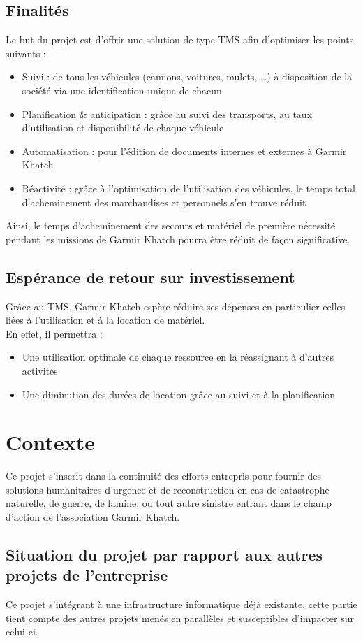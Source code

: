 \subsection{Finalités}
Le but du projet est d'offrir une solution de type TMS afin d'optimiser les points suivants :
\begin{itemize}
\item Suivi : de tous les véhicules (camions, voitures, mulets, …) à disposition de la société via une identification unique de chacun
\item Planification \& anticipation : grâce au suivi des transports, au taux d'utilisation et disponibilité de chaque véhicule
\item Automatisation : pour l'édition de documents internes et externes à Garmir Khatch
\item Réactivité : grâce à l'optimisation de l'utilisation des véhicules, le temps total d'acheminement des marchandises et personnels s'en trouve réduit
\end{itemize}
Ainsi, le temps d'acheminement des secours et matériel de première nécessité pendant les missions de Garmir Khatch pourra être réduit de façon significative.

\subsection{Espérance de retour sur investissement}
Grâce au TMS, Garmir Khatch espère réduire ses dépenses en particulier celles liées à l'utilisation et à la location de matériel.
\\
En effet, il permettra :
\begin{itemize}
\item Une utilisation optimale de chaque ressource en la réassignant à d'autres activités
\item Une diminution des durées de location grâce au suivi et à la planification
\end{itemize}

\section{Contexte}
Ce projet s'inscrit dans la continuité des efforts entrepris pour fournir des solutions humanitaires d'urgence et de reconstruction en cas de catastrophe naturelle, de guerre, de famine, ou tout autre sinistre entrant dans le champ d'action de l'association Garmir Khatch.

\subsection{Situation du projet par rapport aux autres projets de l'entreprise}
Ce projet s'intégrant à une infrastructure informatique déjà existante, cette partie tient compte des autres projets menés en parallèles et susceptibles d'impacter sur celui-ci.

